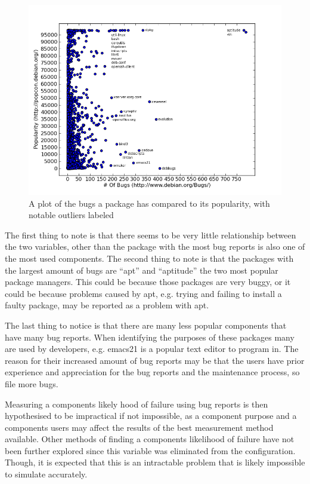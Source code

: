 \begin{figure}[htp]
\begin{center}
  \includegraphics[width=\textwidth]{simulationpics/bugsvspopularity}
  \caption[Bugs v.s. Popularity]{A plot of the bugs a package has compared to its popularity, with notable outliers labeled}
  \label{bugsvspop}
\end{center}
\end{figure}

The first thing to note is that there seems to be very little relationship between the two variables, other than the package with the most bug reports is also one of the most used components.
The second thing to note is that the packages with the largest amount of bugs are ``apt'' and ``aptitude'' the two most popular package managers.
This could be because those packages are very buggy, or it could be because problems caused by apt, e.g. trying and failing to install a faulty package, may be reported as a problem with apt.

The last thing to notice is that there are many less popular components that have many bug reports.
When identifying the purposes of these packages many are used by developers, e.g. emacs21 is a popular text editor to program in.
The reason for their increased amount of bug reports may be that the users have prior experience and appreciation for the bug reports and the maintenance process, so file more bugs.

Measuring a components likely hood of failure using bug reports is then hypothesised to be impractical if not impossible,
as a component purpose and a components users may affect the results of the best measurement method available.
Other methods of finding a components likelihood of failure have not been further explored since this variable was eliminated from the configuration.
Though, it is expected that this is an intractable problem that is likely impossible to simulate accurately.

